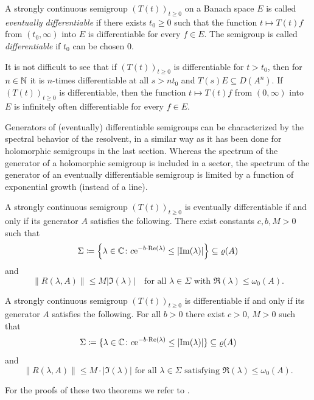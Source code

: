 \begin{definition}\label{def:a2-1.16}
A strongly continuous semigroup $(T(t))_{t \geq 0}$ on a Banach space $E$ is called \emph{eventually differentiable} if there exists $t_0 \geq 0$ such that the function $t \mapsto T(t)f$ from $(t_0,\infty)$ into $E$ is differentiable for every $f \in E$.
The semigroup is called \emph{differentiable} if\/ $t_0$ can be chosen $0$.
\end{definition}

It is not difficult to see that if\/ $(T(t))_{t \geq 0}$ is differentiable for $t > t_{0}$, then for $n \in \mathbb{N}$ it is $n$-times differentiable at all $s > nt_{0}$ and $T(s)E \subseteq D(A^n)$. 
If\/ $(T(t))_{t\geq 0}$ is differentiable, then the function $t \mapsto T(t)f$ from $(0,\infty)$ into $E$ is infinitely often differentiable for every $f \in E$.

Generators of (eventually) differentiable semigroups 
can be characterized by the spectral behavior of the resolvent,
in a similar way as it has been done for holomorphic semigroups in the last section.
Whereas the spectrum of the generator of a holomorphic semigroup is included in a sector, the spectrum of the generator of an eventually differentiable semigroup is limited by a function of exponential growth (instead of a line).
\begin{theorem}\label{thm:a2-1.17}
A strongly continuous semigroup $(T(t))_{t\geq 0}$ is eventually
differentiable if and only if its generator $A$ satisfies the following.
There exist constants $c, b, M > 0$ such that
\[
    \Sigma \coloneq \left\{\lambda \in \C \colon 
        c\eu^{-b\cdot\Re(\lambda)} \leq \lvert\Im(\lambda)\rvert
    \right\} \subseteq \rho(A)
\]
and
\[
    \lVert R(\lambda,A) \rVert \leq M \lvert\Im(\lambda)\rvert
    \quad \text{for all } \lambda \in \Sigma 
    \text{ with } \Re(\lambda) \leq \omega_0(A).
\]
\end{theorem}
\begin{theorem}\label{thm:a2-1.18}
A strongly continuous semigroup $(T(t))_{t\geq 0}$ is differentiable if and only if its generator $A$ satisfies the following. 
For all $b>0$ there exist $c>0$, $M>0$ such that
\[
    \Sigma \coloneq \{\lambda \in \C \colon c\eu^{-b\cdot \Re(\lambda)} 
    	\leq  \lvert \Im(\lambda) \rvert\} \subseteq \rho(A)
\]
and
\[
    \|R(\lambda,A)\| \leq M\cdot \lvert \Im(\lambda) \rvert \text{ for all } \lambda \in \Sigma \text{ satisfying } \Re(\lambda) \leq \omega_{0}(A).
\]
\end{theorem}
For the proofs of these two theorems we refer to \textcite[Chapter 2, Theorems 4.7 and 4.8]{pazy:1983}.
